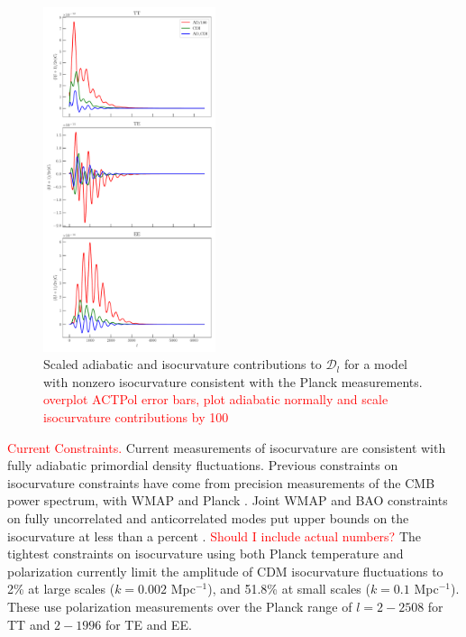 \documentclass{emulateapj}
\newcommand\writingnote[1]{\textcolor{red}{#1}}
\begin{document}
\begin{figure}[h]
\includegraphics[width=0.45\textwidth]{figures/isocurvature_fiducial_spectra_contributions.pdf}
\caption{Scaled adiabatic and isocurvature contributions to $\mathcal{D}_l$ for a model with nonzero isocurvature consistent with the Planck measurements. \writingnote{overplot ACTPol error bars, plot adiabatic normally and scale isocurvature contributions by 100}\label{fig:effects}}
\end{figure}


\writingnote{Current Constraints.}
Current measurements of isocurvature are consistent with fully adiabatic primordial density fluctuations. Previous constraints on isocurvature constraints have come from precision measurements of the CMB power spectrum, with WMAP \citep{moodley/etal:2004} and Planck \citep{planckXXII:2013}. Joint WMAP and BAO constraints on fully uncorrelated and anticorrelated modes put upper bounds on the isocurvature at less than a percent \citep{hinshaw/etal:2013}. \writingnote{Should I include actual numbers?} The tightest constraints on isocurvature using both Planck temperature and polarization \citep{planckXX:2015} currently limit the amplitude of CDM isocurvature fluctuations to 2\% at large scales ($k=0.002$ Mpc$^{-1}$), and 51.8\% at small scales ($k=0.1$ Mpc$^{-1}$). These use polarization measurements over the Planck range of $l=2-2508$ for TT and $2-1996$ for TE and EE.
\end{document}

